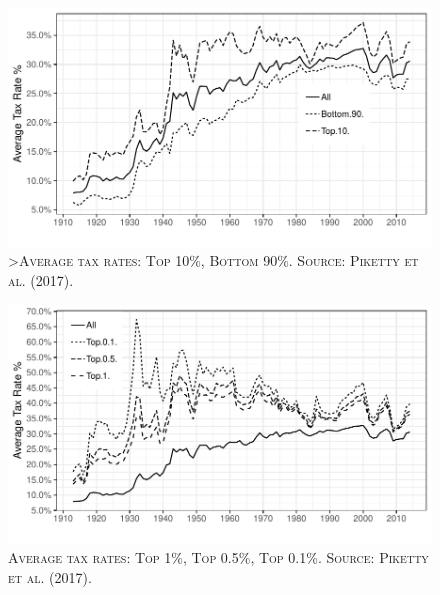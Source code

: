 \documentclass[]{book}
\begin{document}
\begin{figure}

{\centering \includegraphics[width=0.8\linewidth,height=0.8\textheight]{figures/taxes-top} 

}

\caption{\textsc{\textgreater{}Average tax rates: Top 10\%,
Bottom 90\%. Source: Piketty et al. (2017).}}\label{fig:taxes-top}
\end{figure}




\begin{figure}

{\centering \includegraphics[width=0.8\linewidth,height=0.8\textheight]{figures/taxes-top2} 

}

\caption{\textsc{Average tax rates: Top 1\%, Top 0.5\%, Top
0.1\%. Source: Piketty et al. (2017).}}\label{fig:taxes-top2}
\end{figure}
\end{document}
